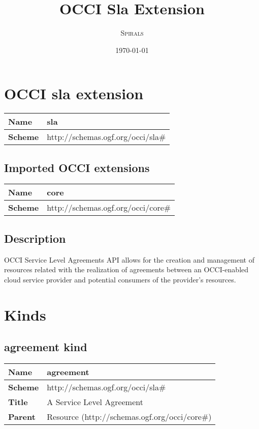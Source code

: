 \documentclass{article}
\title{OCCI Sla Extension} %
\author{\textsc{Spirals}} %
\date{\today} %
\begin{document}
 

\maketitle %
\newpage
\section{OCCI sla extension}
\begin{center}
\begin{tabular}{|l|l|}
  \hline
  \textbf{Name} & sla \\
  \hline  
  \textbf{Scheme} & http://schemas.ogf.org/occi/sla\# \\
  \hline
\end{tabular}
\end{center}
\subsection{Imported OCCI extensions}

\begin{center} 
\begin{tabular}{|l|l|}
  \hline
  \textbf{Name} & core \\
  \hline  
  \textbf{Scheme} & http://schemas.ogf.org/occi/core\# \\
  \hline
\end{tabular}
\end{center}

\subsection{Description}
OCCI Service Level Agreements API allows for the creation and management of resources related with the realization of agreements between an OCCI-enabled cloud service provider and potential consumers of the provider's resources.
\section{Kinds}
\subsection{agreement kind}
\begin{center}
\begin{tabular}{|l|l|}
  \hline
  \textbf{Name} & agreement \\
  \hline  
  \textbf{Scheme} & http://schemas.ogf.org/occi/sla\# \\
  \hline
  \textbf{Title} & A Service Level Agreement \\
  \hline
  \textbf{Parent} & Resource (http://schemas.ogf.org/occi/core\#) \\
  \hline
\end{tabular}
\end{center}
\end{document}

